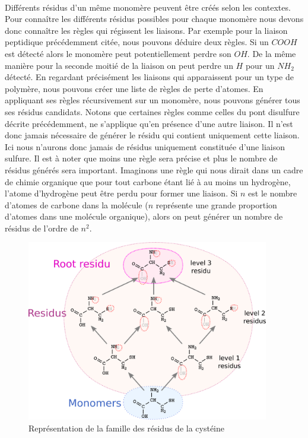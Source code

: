 \documentclass[12pt,french,twoside]{report}
\begin{document}
\paragraph{}Différents résidus d'un même monomère peuvent être créés selon les contextes. Pour connaître les différents résidus
possibles pour chaque monomère nous devons donc connaître les règles qui régissent les liaisons. Par exemple pour la liaison
peptidique précédemment citée, nous pouvons déduire deux règles. Si un $COOH$ est détecté alors le monomère peut potentiellement
perdre son $OH$. De la même manière pour la seconde moitié de la liaison on peut perdre un $H$ pour un $NH_2$ détecté. En
regardant précisément les liaisons qui apparaissent pour un type de polymère, nous pouvons créer une liste de règles de perte
d'atomes. En appliquant ses règles récursivement sur un monomère, nous pouvons générer tous ses résidus candidats. Notons que
certaines règles comme celles du pont disulfure décrite précédemment, ne s'applique qu'en présence d'une autre liaison. Il n'est
donc jamais nécessaire de générer le résidu qui contient uniquement cette liaison. Ici nous n'aurons donc jamais de résidus
uniquement constituée d'une liaison sulfure. Il est
à noter que moins une règle sera précise et plus le nombre de résidus générés sera important. Imaginons une règle qui nous dirait
dans un cadre de chimie organique que pour tout carbone étant lié à au moins un hydrogène, l'atome d'hydrogène peut être perdu
pour former une liaison. Si $n$ est le nombre d'atomes de carbone dans la molécule ($n$ représente une grande proportion d'atomes
dans une molécule organique), alors on peut générer un nombre de résidus de l'ordre de $n^2$.

\begin{figure}[!ht]
  \begin{center}
    \includegraphics[width=400px]{Figures/s2m/residues/cystein_family.png}
    \caption{\label{sulfure}Représentation de la famille des résidus de la cystéine}
  \end{center}
\end{figure}
\end{document}
